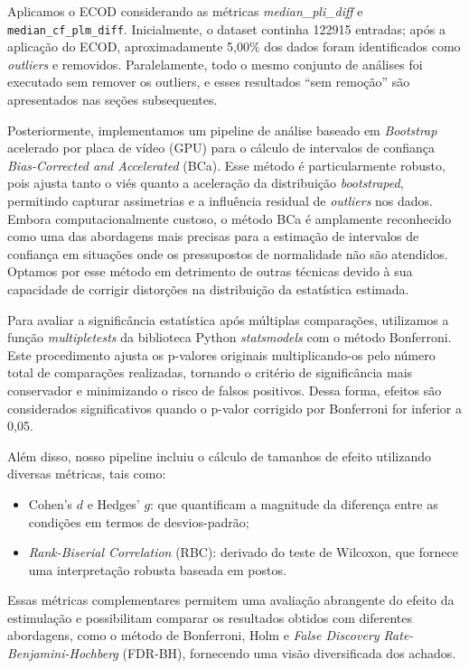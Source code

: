Aplicamos o ECOD considerando as métricas \textit{median\_pli\_diff} e \texttt{median\_cf\_plm\_diff}. Inicialmente, o dataset continha 122915 entradas; após a aplicação do ECOD, aproximadamente 5,00\% dos dados foram identificados como \textit{outliers} e removidos. Paralelamente, todo o mesmo conjunto de análises foi executado sem remover os outliers, e esses resultados ``sem remoção'' são apresentados nas seções subsequentes.

Posteriormente, implementamos um pipeline de análise baseado em \textit{Bootstrap} acelerado por placa de vídeo (GPU) para o cálculo de intervalos de confiança \textit{Bias-Corrected and Accelerated} (BCa). Esse método é particularmente robusto, pois ajusta tanto o viés quanto a aceleração da distribuição \textit{bootstraped}, permitindo capturar assimetrias e a influência residual de \textit{outliers} nos dados. Embora computacionalmente custoso, o método BCa é amplamente reconhecido como uma das abordagens mais precisas para a estimação de intervalos de confiança em situações onde os pressupostos de normalidade não são atendidos. Optamos por esse método em detrimento de outras técnicas devido à sua capacidade de corrigir distorções na distribuição da estatística estimada.

Para avaliar a significância estatística após múltiplas comparações, utilizamos a função \textit{multipletests} da biblioteca Python \textit{statsmodels} com o método Bonferroni. Este procedimento ajusta os p-valores originais multiplicando-os pelo número total de comparações realizadas, tornando o critério de significância mais conservador e minimizando o risco de falsos positivos. Dessa forma, efeitos são considerados significativos quando o p-valor corrigido por Bonferroni for inferior a 0,05.

Além disso, nosso pipeline incluiu o cálculo de tamanhos de efeito utilizando diversas métricas, tais como:
\begin{itemize}
    \item Cohen's \(d\) e Hedges' \(g\): que quantificam a magnitude da diferença entre as condições em termos de desvios-padrão;
    \item \textit{Rank-Biserial Correlation} (RBC): derivado do teste de Wilcoxon, que fornece uma interpretação robusta baseada em postos.
\end{itemize}

Essas métricas complementares permitem uma avaliação abrangente do efeito da estimulação e possibilitam comparar os resultados obtidos com diferentes abordagens, como o método de Bonferroni, Holm e \textit{False Discovery Rate-Benjamini-Hochberg} (FDR-BH), fornecendo uma visão diversificada dos achados.

